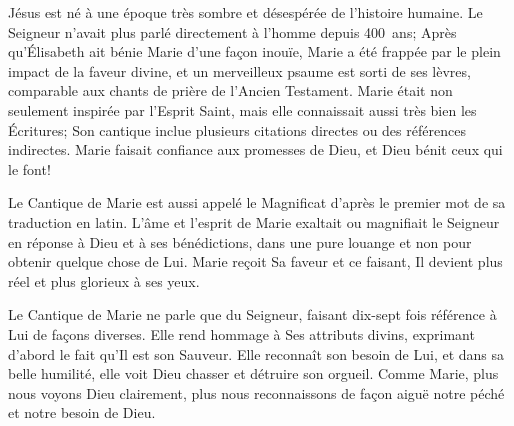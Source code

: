 


Jésus est né à une époque très sombre et désespérée de l'histoire humaine. Le Seigneur n'avait plus parlé directement à l'homme depuis 400~ans; Après qu'Élisabeth ait bénie Marie d'une façon inouïe, Marie a été frappée par le plein impact de la faveur divine, et un merveilleux psaume est sorti de ses lèvres, comparable aux chants de prière de l'Ancien Testament. Marie était non seulement inspirée par l'Esprit Saint, mais elle connaissait aussi très bien les Écritures; Son cantique inclue plusieurs citations directes ou des références indirectes. Marie faisait confiance aux promesses de Dieu, et Dieu bénit ceux qui le font!

Le Cantique de Marie est aussi appelé le \og Magnificat \fg{} d'après le premier mot de sa traduction en latin. L'âme et l'esprit de Marie exaltait ou \og magnifiait \fg{} le Seigneur en réponse à Dieu et à ses bénédictions, dans une pure louange et non pour obtenir quelque chose de Lui. Marie reçoit Sa faveur et ce faisant, Il devient plus réel et plus glorieux à ses yeux.

Le Cantique de Marie ne parle que du Seigneur, faisant dix-sept fois référence à Lui de façons diverses. Elle rend hommage à Ses attributs divins, exprimant d'abord le fait qu'Il est son Sauveur. Elle reconnaît son besoin de Lui, et dans sa belle humilité, elle voit Dieu chasser et détruire son orgueil. Comme Marie, plus nous voyons Dieu clairement, plus nous reconnaissons de façon aiguë notre péché et notre besoin de Dieu.

